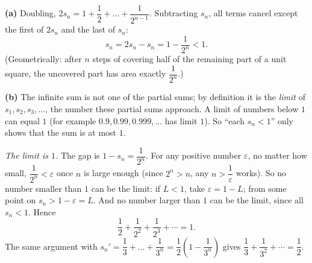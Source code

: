 \textbf{(a)} Doubling, $2s_n=1+\dfrac{1}{2}+\dots+\dfrac{1}{2^{n-1}}$. Subtracting $s_n$, all terms cancel except the first of $2s_n$ and the last of $s_n$:
\[
s_n=2s_n-s_n=1-\dfrac{1}{2^n}<1 .
\]
(Geometrically: after $n$ steps of covering half of the remaining part of a unit square, the uncovered part has area exactly $\dfrac{1}{2^n}$.)

\textbf{(b)} The infinite sum is not one of the partial sums; by definition it is the \emph{limit} of $s_1,s_2,s_3,\dots$, the number these partial sums approach. A limit of numbers below $1$ can equal $1$ (for example $0.9,0.99,0.999,\dots$ has limit $1$). So ``each $s_n<1$'' only shows that the sum is at most $1$.

\emph{The limit is $1$.} The gap is $1-s_n=\dfrac{1}{2^n}$. For any positive number $\varepsilon$, no matter how small, $\dfrac{1}{2^n}<\varepsilon$ once $n$ is large enough (since $2^n>n$, any $n>\dfrac{1}{\varepsilon}$ works). So no number smaller than $1$ can be the limit: if $L<1$, take $\varepsilon=1-L$; from some point on $s_n>1-\varepsilon=L$. And no number larger than $1$ can be the limit, since all $s_n<1$. Hence
\[
\dfrac{1}{2}+\dfrac{1}{2^2}+\dfrac{1}{2^3}+\cdots=\boxed{1}.
\]
The same argument with $s_n'=\dfrac{1}{3}+\dots+\dfrac{1}{3^n}=\dfrac{1}{2}\left(1-\dfrac{1}{3^n}\right)$ gives $\dfrac{1}{3}+\dfrac{1}{3^2}+\cdots=\dfrac{1}{2}$.
